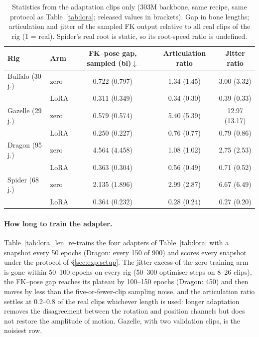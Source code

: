 \begin{table}[h]
\centering\footnotesize
\caption{Statistics from the adaptation clips only (\num{303}M backbone, same recipe, same protocol as
Table~\ref{tab:lora}; released values in brackets). Gap in bone lengths; articulation and jitter of the sampled FK
output relative to all real clips of the rig (1 = real). Spider's real root is static, so its root-speed ratio is
undefined.}\label{tab:supportonly}
\begin{tabular}{@{}llccc@{}}
\toprule
Rig & Arm & FK--pose gap, sampled (bl)$\downarrow$ & Articulation ratio & Jitter ratio \\
\midrule
Buffalo (30 j.) & zero & \num{0.722} (\num{0.797}) & \num{1.34} (\num{1.45}) & \num{3.00} (\num{3.32}) \\
                & LoRA & \num{0.311} (\num{0.349}) & \num{0.34} (\num{0.30}) & \num{0.39} (\num{0.33}) \\
\midrule
Gazelle (29 j.) & zero & \num{0.579} (\num{0.574}) & \num{5.40} (\num{5.39}) & \num{12.97} (\num{13.17}) \\
                & LoRA & \num{0.250} (\num{0.227}) & \num{0.76} (\num{0.77}) & \num{0.79} (\num{0.86}) \\
\midrule
Dragon (95 j.)  & zero & \num{4.564} (\num{4.458}) & \num{1.08} (\num{1.02}) & \num{2.75} (\num{2.53}) \\
                & LoRA & \num{0.363} (\num{0.304}) & \num{0.56} (\num{0.49}) & \num{0.71} (\num{0.52}) \\
\midrule
Spider (68 j.)  & zero & \num{2.135} (\num{1.896}) & \num{2.99} (\num{2.87}) & \num{6.67} (\num{6.49}) \\
                & LoRA & \num{0.364} (\num{0.232}) & \num{0.28} (\num{0.24}) & \num{0.27} (\num{0.20}) \\
\bottomrule
\end{tabular}
\end{table}

\paragraph{How long to train the adapter.} Table~\ref{tab:lora_len} re-trains the four adapters of
Table~\ref{tab:lora} with a snapshot every 50 epochs (Dragon: every 150 of 900) and scores every snapshot under the
protocol of \S\ref{sec:exp:setup}. The jitter excess of the zero-training arm is gone within 50--100 epochs on every
rig (\num{50}--\num{300} optimiser steps on 8--26 clips), the FK--pose gap reaches its plateau by 100--150 epochs
(Dragon: 450) and then moves by less than the five-or-fewer-clip sampling noise, and the articulation ratio settles at \num{0.2}--\num{0.8} of the real clips whichever length is used:
longer adaptation removes the disagreement between the rotation and position channels but does not restore the
amplitude of motion. Gazelle, with two validation clips, is the noisiest row.


